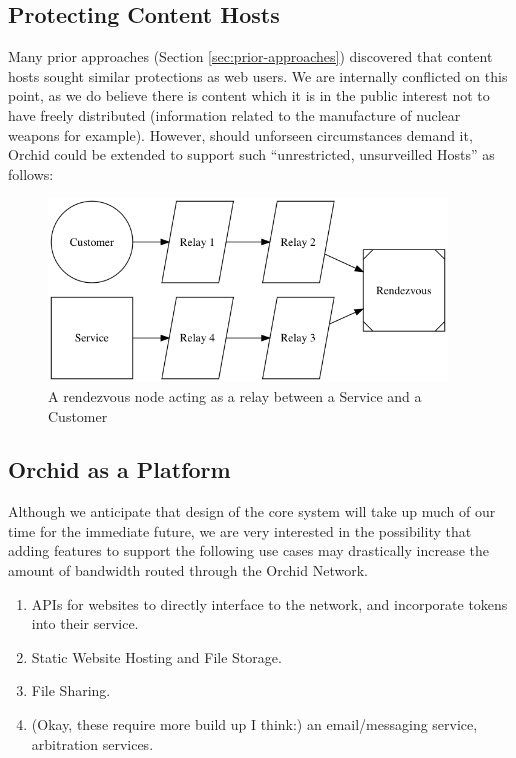\documentclass{article}
\newcommand{\mesh}{Orchid}
\newcommand{\Mesh}{\mesh}
\begin{document}
\subsection{Protecting Content Hosts}
\label{subsec:protocol-extentions}

Many prior approaches (Section \ref{sec:prior-approaches}) discovered that content hosts sought similar protections as web users. We are internally conflicted on this point, as we do believe there is content which it is in the public interest not to have freely distributed (information related to the manufacture of nuclear weapons for example). However, should unforseen circumstances demand it, \Mesh{} could be extended to support such ``unrestricted, unsurveilled Hosts'' as follows:

\begin{figure}[htbp]
  \centering
  \includegraphics[width = 300pt]{sttRttc}
  \caption{A rendezvous node acting as a relay between a Service and a Customer}
\end{figure}

\subsection{Orchid as a Platform}

Although we anticipate that design of the core system will take up
much of our time for the immediate future, we are very interested in
the possibility that adding features to support the following use
cases may drastically increase the amount of bandwidth routed through
the Orchid Network.

\begin{enumerate}
\item APIs for websites to directly interface to the network, and
  incorporate tokens into their service.
\item Static Website Hosting and File Storage.
\item File Sharing.
\item (Okay, these require more build up I think:) an email/messaging
  service, arbitration services.
\end{enumerate}

\nocite{*}
\printbibliography
\end{document}
